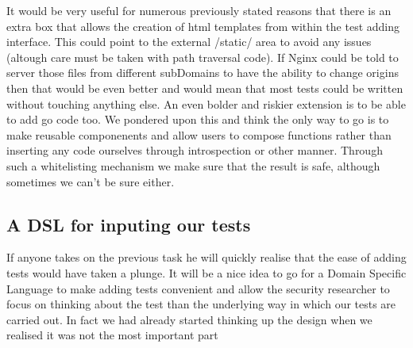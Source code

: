 It would be very useful for numerous previously stated reasons that there is an extra box that allows the creation of html templates
from within the test adding interface. This could point to the external /static/ area to avoid any issues (altough care must be taken with path traversal code).
If Nginx could be told to server those files from different subDomains to have the ability to change origins then that would be even better
and would mean that most tests could be written without touching anything else.
An even bolder and riskier extension is to be able to add go code too. We pondered upon this and think the only way to go is to make reusable componenents and allow
users to compose functions rather than inserting any code ourselves through introspection or other manner. Through such a whitelisting mechanism we make sure that the result
is safe, although sometimes we can't be sure either.

\subsection{A DSL for inputing our tests}

If anyone takes on the previous task he will quickly realise that the ease of adding tests would have taken a plunge. It will be a nice idea
to go for a Domain Specific Language to make adding tests convenient and allow the security researcher to focus on thinking about the test than the underlying way 
in which our tests are carried out. In fact we had already started thinking up the design when we realised it was not the most important part 

